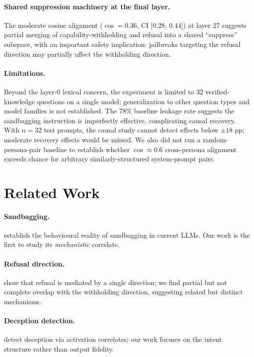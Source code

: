 \documentclass{article}
\begin{document}
\paragraph{Shared suppression machinery at the final layer.}
The moderate cosine alignment ($\cos = 0.36$, CI [0.28, 0.44]) at layer 27 suggests partial merging of capability-withholding and refusal into a shared ``suppress'' subspace, with an important safety implication: jailbreaks targeting the refusal direction may partially affect the withholding direction.

\paragraph{Limitations.}
Beyond the layer-0 lexical concern, the experiment is limited to 32 verified-knowledge questions on a single model; generalization to other question types and model families is not established.
The 78\% baseline leakage rate suggests the sandbagging instruction is imperfectly effective, complicating causal recovery.
With $n = 32$ test prompts, the causal study cannot detect effects below $\pm 18$ pp; moderate recovery effects would be missed.
We also did not run a random-persona-pair baseline to establish whether $\cos \approx 0.6$ cross-persona alignment exceeds chance for arbitrary similarly-structured system-prompt pairs.

\section{Related Work}
\label{sec:related}

\paragraph{Sandbagging.}
\citet{vanderweij2024sandbagging} establish the behavioural reality of sandbagging in current LLMs.
Our work is the first to study its \emph{mechanistic} correlate.

\paragraph{Refusal direction.}
\citet{arditi2024refusal} show that refusal is mediated by a single direction; we find partial but not complete overlap with the withholding direction, suggesting related but distinct mechanisms.

\paragraph{Deception detection.}
\citet{pacchiardi2023catch} detect deception via activation correlates; our work focuses on the intent structure rather than output fidelity.
\end{document}
